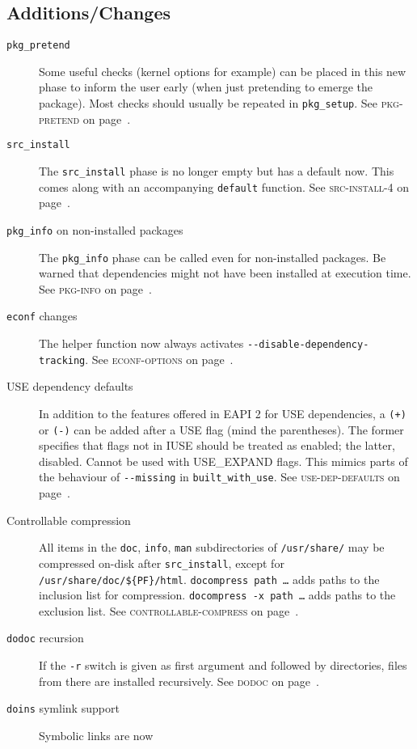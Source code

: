 \documentclass[a4paper,notumble]{leaflet}
\newcommand{\code}[1]{\texttt{#1}}
\newcommand{\featureref}[1]{\textsc{#1} on page~\pageref{feat:#1}}
\begin{document}
\subsection{Additions/Changes}
\label{sec:cs:eapi4-additions}
\begin{description}
    \item[\code{pkg\_pretend}] Some useful checks (kernel options for
    example) can be placed in this new phase to inform the user early
    (when just pretending to emerge the package).  Most checks should
    usually be repeated in \code{pkg\_setup}.
    See \featureref{pkg-pretend}.
    \item[\code{src\_install}] The \code{src\_install} phase is no
    longer empty but has a default now.  This comes along with an
    accompanying \code{default} function.
    See \featureref{src-install-4}.
    \item[\code{pkg\_info} on non-installed packages] The
    \code{pkg\_info} phase can be called even for non-installed
    packages.  Be warned that dependencies might not have been
    installed at execution time.  See \featureref{pkg-info}.
    \item[\code{econf} changes] The helper function now always
    activates \code{-{}-disable-dependency-tracking}.
    See \featureref{econf-options}.
    \item[USE dependency defaults] In addition to the features offered
    in EAPI 2 for USE dependencies, a \code{(+)} or \code{(-)} can be
    added after a USE flag (mind the parentheses).  The former
    specifies that flags not in IUSE should be treated as enabled; the
    latter, disabled. Cannot be used with USE\_EXPAND flags.  This
    mimics parts of the behaviour of \code{-{}-missing} in
    \code{built\_with\_use}.  See \featureref{use-dep-defaults}.
    \item[Controllable compression] All items in the \code{doc},
    \code{info}, \code{man} subdirectories of \code{/usr/share/} may
    be compressed on-disk after \code{src\_install}, except for
    \code{/usr/share/doc/\$\{PF\}/html}.  \code{docompress path \dots}
    adds paths to the inclusion list for compression.
    \code{docompress -x path \dots} adds paths to the exclusion list.
    See \featureref{controllable-compress}.
    \item[\code{dodoc} recursion] If the \code{-r} switch is given as
    first argument and followed by directories, files from there are
    installed recursively.  See \featureref{dodoc}.
    \item[\code{doins} symlink support] Symbolic links are now

\end{description}
\end{document}
